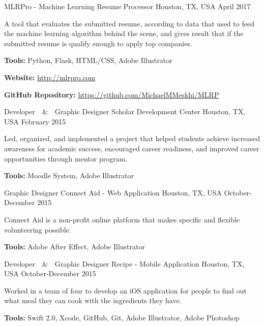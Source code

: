 \begin{cventries}
    {MLRPro - Machine Learning Resume Processor}
    {Houston, TX, USA}
    {April 2017}
    {
      \begin{cvitems}
        \item {A tool that evaluates the submitted resume, according to data that used to feed the machine learning algorithm behind the scene, and gives result that if the submitted resume is qualify enough to apply top companies.}
        \item {\textbf{Tools:} Python, Flask, HTML/CSS, Adobe Illustrator}
        \item {\textbf{Website:} \href{http://mlrpro.com}{http://mlrpro.com} }
        \item {\textbf{GitHub Repository:} \href{https://github.com/MichaelMMeskhi/MLRP}{https://github.com/MichaelMMeskhi/MLRP}}
      \end{cvitems}
    }
  \cventry
  	{Developer~~\&~~Graphic Designer}
    {Scholar Development Center}
    {Houston, TX, USA}
    {February 2015}
    {
      \begin{cvitems}
        \item {Led, organized, and implemented a project that helped students achieve increased awareness for academic success, encouraged career readiness, and improved career opportunities through mentor program.}
        \item {\textbf{Tools:} Moodle System, Adobe Illustrator}
      \end{cvitems}
    }
    \cventry
  	{Graphic Designer}
    {Connect Aid - \tiny{Web Application}}
    {Houston, TX, USA}
    {October-December 2015}
    {
      \begin{cvitems}
        \item {Connect Aid is a non-profit online platform that makes specific and flexible volunteering possible.}
        \item {\textbf{Tools:} Adobe After Effect, Adobe Illustrator}
      \end{cvitems}
    }
    \cventry
  	{Developer~~\&~~Graphic Designer}
    {Recipe - \tiny{Mobile Application}}
    {Houston, TX, USA}
    {October-December 2015}
    {
      \begin{cvitems}
        \item {Worked in a team of four to develop an iOS application for people to find out what meal they can cook with the ingredients they have.}
        \item {\textbf{Tools:} Swift 2.0, Xcode, GitHub, Git, Adobe Illustrator, Adobe Photoshop}
      \end{cvitems}
}
\end{cventries}
